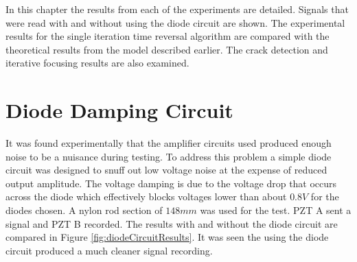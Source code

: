 
In this chapter the results from each of the experiments are detailed. Signals that were read with and without using the diode circuit are shown. The experimental results for the single iteration time reversal algorithm are compared with the theoretical results from the model described earlier. The crack detection and iterative focusing results are also examined.

\section{Diode Damping Circuit}
It was found experimentally that the amplifier circuits used produced enough noise to be a nuisance during testing. To address this problem a simple diode circuit was designed to snuff out low voltage noise at the expense of reduced output amplitude. The voltage damping is due to the voltage drop that occurs across the diode which effectively blocks voltages lower than about $0.8V $ for the diodes chosen. A nylon rod section of $148mm$ was used for the test. PZT A sent a signal and PZT B recorded. The results with and without the diode circuit are compared in Figure \ref{fig:diodeCircuitResults}. It was seen the using the diode circuit produced a much cleaner signal recording.

